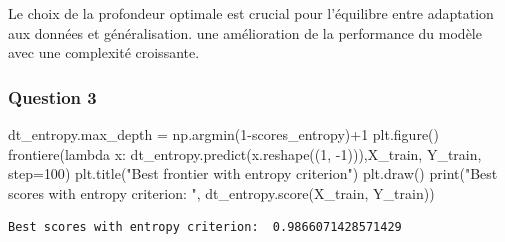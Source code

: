 \documentclass[
  letterpaper,
  DIV=11,
  numbers=noendperiod]{scrartcl}
\newenvironment{Shaded}{\begin{snugshade}}{\end{snugshade}}
\newcommand{\BuiltInTok}[1]{\textcolor[rgb]{0.00,0.23,0.31}{#1}}
\newcommand{\DecValTok}[1]{\textcolor[rgb]{0.68,0.00,0.00}{#1}}
\newcommand{\KeywordTok}[1]{\textcolor[rgb]{0.00,0.23,0.31}{#1}}
\newcommand{\NormalTok}[1]{\textcolor[rgb]{0.00,0.23,0.31}{#1}}
\newcommand{\OperatorTok}[1]{\textcolor[rgb]{0.37,0.37,0.37}{#1}}
\newcommand{\StringTok}[1]{\textcolor[rgb]{0.13,0.47,0.30}{#1}}
\begin{document}
Le choix de la profondeur optimale est crucial pour l'équilibre entre
adaptation aux données et généralisation. une amélioration de la
performance du modèle avec une complexité croissante.

\hypertarget{question-3}{%
\subsubsection{\texorpdfstring{Question 3
}{Question 3 }}\label{question-3}}

\begin{Shaded}
\begin{Highlighting}[]
\NormalTok{dt\_entropy.max\_depth }\OperatorTok{=}\NormalTok{ np.argmin(}\DecValTok{1}\OperatorTok{{-}}\NormalTok{scores\_entropy)}\OperatorTok{+}\DecValTok{1}
\NormalTok{plt.figure()}
\NormalTok{frontiere(}\KeywordTok{lambda}\NormalTok{ x: dt\_entropy.predict(x.reshape((}\DecValTok{1}\NormalTok{, }\OperatorTok{{-}}\DecValTok{1}\NormalTok{))),X\_train, Y\_train, step}\OperatorTok{=}\DecValTok{100}\NormalTok{)}
\NormalTok{plt.title(}\StringTok{"Best frontier with entropy criterion"}\NormalTok{)}
\NormalTok{plt.draw()}
\BuiltInTok{print}\NormalTok{(}\StringTok{"Best scores with entropy criterion: "}\NormalTok{, dt\_entropy.score(X\_train, Y\_train))}
\end{Highlighting}
\end{Shaded}

\begin{verbatim}
Best scores with entropy criterion:  0.9866071428571429
\end{verbatim}
\end{document}
